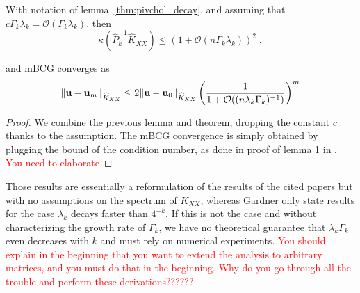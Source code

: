 \documentclass{article}
\begin{document}
{\begin{theorem}\label{thm:mbcg_precond}
With notation of lemma~\ref{thm:pivchol_decay}, and assuming that $c\Gamma_k \lambda_k = \mathcal O(\Gamma_k \lambda_k)$, then 
\begin{equation*}
    \kappa \left( \widehat P_k^{-1} \widehat K_{XX} \right) \le (1 + \mathcal O(n \Gamma_k \lambda_k) )^2 \; ,
\end{equation*}

and mBCG converges as 
\begin{equation*}
    \Vert \boldsymbol{\mathbf{u}} - \boldsymbol{\mathbf{u}}_m \Vert_{\widehat K_{XX}} 
    \le 2 \Vert \boldsymbol{\mathbf{u}} - \boldsymbol{\mathbf{u}}_0 \Vert_{\widehat K_{XX}} \left(\frac{1}{1 + \mathcal O((n \lambda_k \Gamma_k)^{-1}) } \right)^m 
\end{equation*}
\end{theorem}
\begin{proof}
We combine the previous lemma and theorem, dropping the constant $c$ thanks to the assumption. 
The mBCG convergence is simply obtained by plugging the bound of the condition number, as done in proof of lemma 1 in \cite{gardner_gpytorch_2021}. \textcolor{red}{You need to elaborate}
\end{proof}


\begin{remark}
Those results are essentially a reformulation of the results of the cited papers but with no assumptions on the spectrum of $K_{XX}$, whereas Gardner only state results for the case $\lambda_k$ decays faster than $4^{-k}$. 
If this is not the case and without characterizing the growth rate of $\Gamma_k$, we have no theoretical guarantee that $\lambda_k\Gamma_k$ even decreases with $k$ and must rely on numerical experiments. \textcolor{red}{You should explain in the beginning that you want to extend the analysis to arbitrary matrices, and you must do that in the beginning. Why do you go through all the trouble and perform these derivations??????}
\end{remark}

}
\end{document}
